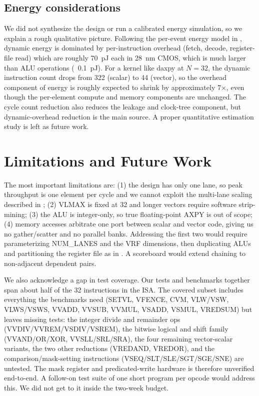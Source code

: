 \documentclass[conference]{IEEEtran}
\begin{document}
\subsection{Energy considerations}
We did not synthesize the design or run a calibrated energy
simulation, so we explain a rough qualitative picture. Following the per-event energy model in
\cite{horowitz_isscc}, dynamic energy is dominated by per-instruction
overhead (fetch, decode, register-file read) which are roughly
70~pJ each in 28~nm CMOS, which is much larger than ALU operations
(~0.1~pJ). For a kernel like daxpy at $N = 32$, the dynamic
instruction count drops from 322 (scalar) to 44 (vector), so the
overhead component of energy is roughly expected to shrink by approximately 7$\times$,
even though the per-element compute and memory components are
unchanged. The cycle count reduction also reduces the leakage and
clock-tree component, but dynamic-overhead reduction is the
main source. A proper quantitative estimation study is left
as future work.

\section{Limitations and Future Work}
The most important limitations are: (1) the design has only one
lane, so peak throughput is one element per cycle and we cannot
exploit the multi-lane scaling described in
\cite[Fig.~4.5]{hp_book}; (2) VLMAX is fixed at 32 and longer
vectors require software strip-mining; (3) the ALU is integer-only,
so true floating-point AXPY is out of scope; (4) memory accesses
arbitrate one port between scalar and vector code, giving us no
gather/scatter and no parallel banks. Addressing the first two would
require parameterizing NUM\_LANES and the VRF dimensions, then
duplicating ALUs and partitioning the register file as in
\cite{hwacha}. A scoreboard would
extend chaining to non-adjacent dependent pairs.

We also acknowledge a gap in test coverage. Our tests and
benchmarks together span about half of the 32 instructions in
the ISA. The covered subset includes everything the benchmarks need (SETVL, VFENCE, CVM, VLW/VSW, VLWS/VSWS, VVADD, VVSUB, VVMUL, VSADD, VSMUL, VREDSUM) but leaves missing tests: the integer divide and remainder ops (VVDIV/VVREM/VSDIV/VSREM), the bitwise logical and shift family (VVAND/OR/XOR, VVSLL/SRL/SRA), the four remaining vector-scalar variants, the two other reductions (VREDAND, VREDOR), and the comparison/mask-setting instructions (VSEQ/SLT/SLE/SGT/SGE/SNE) are untested. The mask register and
predicated-write hardware is therefore unverified end-to-end. A follow-on test suite of one short program per opcode would
address this. We did not get to it inside the two-week budget.
\end{document}
